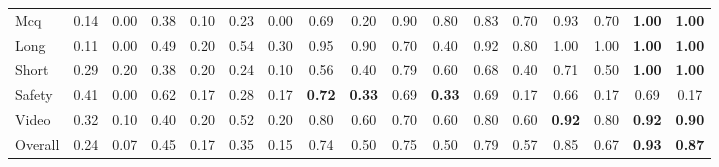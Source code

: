 \begin{table*}[ht]
{\begin{tabular}{lcccccccc|cccccccc}
\midrule
Mcq      & 0.14 & 0.00 & 0.38 & 0.10 & 0.23 & 0.00 & 0.69 & 0.20 & 0.90 & 0.80 & 0.83 & 0.70 & 0.93 & 0.70 & \textbf{1.00} & \textbf{1.00} \\
Long     & 0.11 & 0.00 & 0.49 & 0.20 & 0.54 & 0.30 & 0.95 & 0.90 & 0.70 & 0.40 & 0.92 & 0.80 & 1.00 & 1.00 & \textbf{1.00} & \textbf{1.00} \\
Short    & 0.29 & 0.20 & 0.38 & 0.20 & 0.24 & 0.10 & 0.56 & 0.40 & 0.79 & 0.60 & 0.68 & 0.40 & 0.71 & 0.50 & \textbf{1.00} & \textbf{1.00} \\
Safety   & 0.41 & 0.00 & 0.62 & 0.17 & 0.28 & 0.17 & \textbf{0.72} & \textbf{0.33} & 0.69 & \textbf{0.33} & 0.69 & 0.17 & 0.66 & 0.17 & 0.69 & 0.17 \\
Video    & 0.32 & 0.10 & 0.40 & 0.20 & 0.52 & 0.20 & 0.80 & 0.60 & 0.70 & 0.60 & 0.80 & 0.60 & \textbf{0.92} & 0.80 & \textbf{0.92} & \textbf{0.90} \\ \hline
Overall  & 0.24 & 0.07 & 0.45 & 0.17 & 0.35 & 0.15 & 0.74 & 0.50 & 0.75 & 0.50 & 0.79 & 0.57 & 0.85 & 0.67 & \textbf{0.93} & \textbf{0.87} \\ 
\bottomrule
\end{tabular}%
}
\end{table*}

